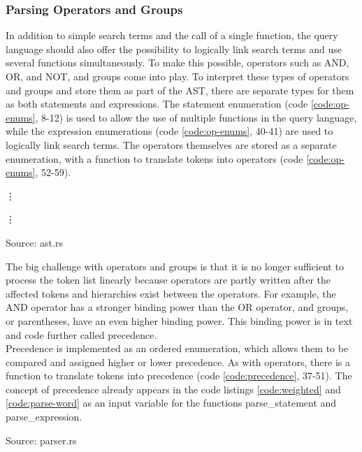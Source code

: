 \subsubsection{Parsing Operators and Groups}
In addition to simple search terms and the call of a single function, the query language should also offer the possibility to logically link search terms and use several functions simultaneously. To make this possible, operators such as AND, OR, and NOT, and groups come into play. To interpret these types of operators and groups and store them as part of the \ac{AST}, there are separate types for them as both statements and expressions. The statement enumeration (code \ref{code:op-enums}, 8-12) is used to allow the use of multiple functions in the query language, while the expression enumerations (code \ref{code:op-enums}, 40-41) are used to logically link search terms. The operators themselves are stored as a separate enumeration, with a function to translate tokens into operators (code \ref{code:op-enums}, 52-59).
\begin{codeenv}
    \label{code:op-enums}
    
    \vdots
    
    \vdots
    
    \centerline{Source: ast.rs}
\end{codeenv}
The big challenge with operators and groups is that it is no longer sufficient to process the token list linearly because operators are partly written after the affected tokens and hierarchies exist between the operators. For example, the AND operator has a stronger binding power than the OR operator, and groups, or parentheses, have an even higher binding power. This binding power is in text and code further called precedence.\\
Precedence is implemented as an ordered enumeration, which allows them to be compared and assigned higher or lower precedence. As with operators, there is a function to translate tokens into precedence (code \ref{code:precedence}, 37-51). The concept of precedence already appears in the code listings \ref{code:weighted} and \ref{code:parse-word} as an input variable for the functions parse\_statement and parse\_expression.
\begin{codeenv}
    \label{code:precedence}
    
    \centerline{Source: parser.rs}
\end{codeenv}
